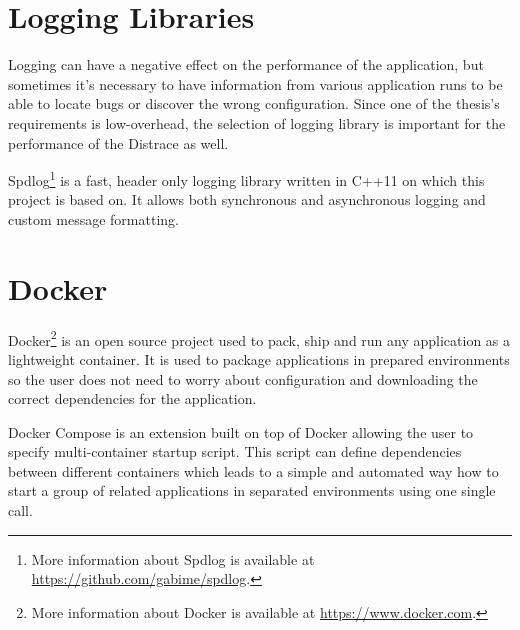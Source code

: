 \section{Logging Libraries}
Logging can have a negative effect on the performance of the application, but sometimes it's necessary to have information from various application runs to be able to locate bugs or discover the wrong configuration. Since one of the thesis's requirements is low-overhead, the selection of logging library is important for the performance of the Distrace as well. 

Spdlog\footnote{More information about Spdlog is available at \url{https://github.com/gabime/spdlog}.} is a fast, header only logging library written in C++11 on which this project is based on. It allows both synchronous and asynchronous logging and custom message formatting.
\section{Docker}
Docker\footnote{More information about Docker is available at \url{https://www.docker.com}.} is an open source project used to pack, ship and run any application as a lightweight container. It is used to package applications in prepared environments so the user does not need to worry about configuration and downloading the correct dependencies for the application. 

Docker Compose is an extension built on top of Docker allowing the user to specify multi-container startup script. This script can define dependencies between different containers which leads to a simple and automated way how to start a group of related applications in separated environments using one single call. 

